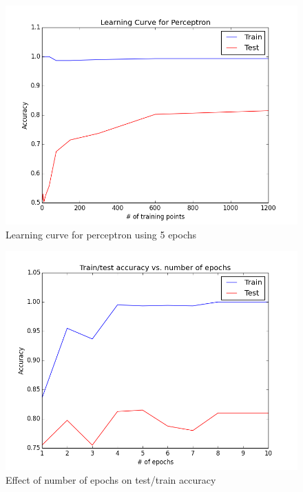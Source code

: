 \documentclass{article}
\begin{document}
	\begin{figure} [h!]
		\centering
		\includegraphics[scale = .65]{LC_perceptron.png}
		\caption{Learning curve for perceptron using 5 epochs}
		\label{lc_percept_fig}
	\end{figure}
		
	\begin{figure} [h!]
		\centering
		\includegraphics[scale = .65]{Epochs_train_test.png}
		\caption{Effect of number of epochs on test/train accuracy}
		\label{epoch_tt_fig}
	\end{figure}
	
\end{document}
